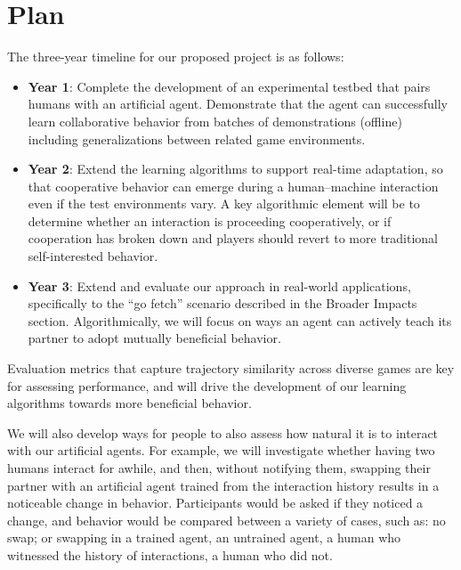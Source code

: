 
\section{Plan}

The three-year timeline for our proposed project is as follows:

\begin{itemize}
\item {\bf Year 1}: Complete the development of an experimental
  testbed that pairs humans with an artificial agent.  Demonstrate
  that the agent can successfully learn collaborative behavior from
  batches of demonstrations (offline) including generalizations
  between related game environments.

\item {\bf Year 2}: Extend the learning algorithms to support
  real-time adaptation, so that cooperative behavior can emerge during
  a human--machine interaction even if the test environments vary. A
  key algorithmic element will be to determine whether an interaction
  is proceeding cooperatively, or if cooperation has broken down and
  players should revert to more traditional self-interested behavior. 

\item {\bf Year 3}: Extend and evaluate our approach in real-world
  applications, specifically to the ``go fetch'' scenario described in
  the Broader Impacts section. Algorithmically, we will focus on ways
  an agent can actively teach its partner to adopt mutually beneficial
  behavior. 

\end{itemize}


Evaluation metrics that capture trajectory similarity across diverse
games are key for assessing performance, and will drive the
development of our learning algorithms towards more beneficial
behavior.

We will also develop ways for people to also assess how natural it is
to interact with our artificial agents. For example, we will
investigate whether having two humans interact for awhile, and then,
without notifying them, swapping their partner with an artificial
agent trained from the interaction history results in a noticeable
change in behavior. Participants would be asked if they noticed a
change, and behavior would be compared between a variety of cases, 
such as: no swap; or swapping in a trained agent, an untrained agent, 
a human who witnessed the history of interactions, a human who did not.

